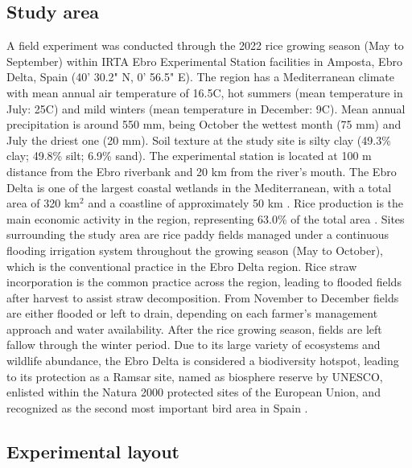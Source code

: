 \subsection{Study area}
\label{sec:meth_Site}

A field experiment was conducted through the 2022 rice growing season (May to September) within IRTA Ebro Experimental Station facilities in Amposta, Ebro Delta, Spain (40' 30.2" N, 0' 56.5" E). The region has a Mediterranean climate with mean annual air temperature of 16.5\degree C, hot summers (mean temperature in July: 25\degree C) and mild winters (mean temperature in December: 9\degree C). Mean annual precipitation is around 550 mm, being October the wettest month (75 mm) and July the driest one (20 mm). Soil texture at the study site is silty clay (49.3\% clay; 49.8\% silt; 6.9\% sand). The experimental station is located at 100 m distance from the Ebro riverbank and 20 km from the river's mouth. The Ebro Delta is one of the largest coastal wetlands in the Mediterranean, with a total area of 320 km$^{2}$ and a coastline of approximately 50 km \citep{rodriguez-santalla2021}. Rice production is the main economic activity in the region, representing 63.0\% of the total area \citep{genua-olmedo2016}. Sites surrounding the study area are rice paddy fields managed under a continuous flooding irrigation system throughout the growing season (May to October), which is the conventional practice in the Ebro Delta region. Rice straw incorporation is the common practice across the region, leading to flooded fields after harvest to assist straw decomposition. From November to December fields are either flooded or left to drain, depending on each farmer's management approach and water availability. After the rice growing season, fields are left fallow through the winter period. Due to its large variety of ecosystems and wildlife abundance, the Ebro Delta is considered a biodiversity hotspot, leading to its protection as a Ramsar site, named as biosphere reserve by UNESCO, enlisted within the Natura 2000 protected sites of the European Union, and recognized as the second most important bird area in Spain \citep{day2006, romagosa2013sustainability, genua-olmedo2016}. 

\subsection{Experimental layout}
\label{sec:meth_Exp}

